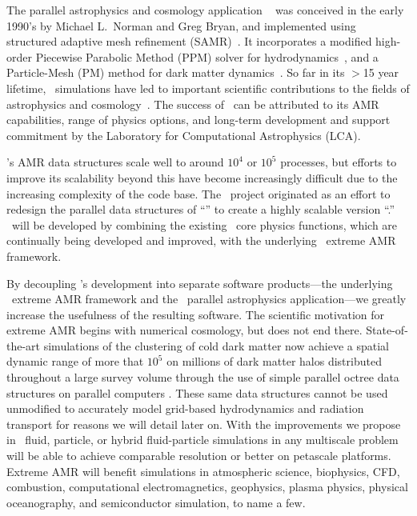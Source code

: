\documentclass[11pt,letterpaper]{article}
\begin{document}


 The parallel astrophysics and
cosmology application \enzo~\cite{OsBr04} was conceived in the early
1990's by Michael L.~Norman and Greg Bryan, and implemented using
structured adaptive mesh refinement (SAMR)~\cite{BeCo89}.  It
incorporates a modified high-order Piecewise Parabolic Method (PPM)
solver for hydrodynamics~\cite{WoCo84b}, and a Particle-Mesh (PM)
method for dark matter dynamics~\cite{HoEa88}.  So far in its $>$15
year lifetime, \enzo\ simulations have led to important scientific
contributions to the fields of astrophysics and 
cosmology~\cite{AbBr02,Hallman07,Kritsuk09,Padoan05}.
The success of \enzo\ can be attributed to
its AMR capabilities, range of physics options, and long-term
development and support commitment by the Laboratory for Computational
Astrophysics (LCA).

\enzo's AMR data structures scale well to around $10^4$ or $10^5$
processes, but efforts to improve its scalability beyond this have
become increasingly difficult due to the increasing
complexity of the code base.  The \cello\ project
originated as an effort to redesign the parallel data structures of
``\enzo'' to create a highly scalable version ``\enzoii.''  \enzoii\
will be developed by combining the existing \enzo\ core physics
functions, which are continually being developed and improved, with
the underlying \cello\ extreme AMR framework.

By decoupling \enzoii's development into separate software
products---the underlying \cello\ extreme AMR framework and the
\enzoii\ parallel astrophysics application---we greatly increase the
usefulness of the resulting software. 
The scientific
motivation for extreme AMR begins with numerical cosmology, but does not
end there. State-of-the-art simulations of the clustering of cold dark matter
now achieve a spatial dynamic range of more that $10^5$ on millions of 
dark matter halos distributed throughout a large survey volume through the use of 
simple parallel octree data structures on parallel computers \cite{Springel05}. 
These same data structures cannot be used unmodified to accurately model 
grid-based hydrodynamics and radiation transport for reasons we will detail later on.
With the improvements we propose in \cello\ fluid, particle, or hybrid
fluid-particle simulations in any multiscale problem will be able to achieve
comparable resolution or better on petascale platforms. Extreme AMR will
benefit simulations in atmospheric science, biophysics, CFD, combustion, 
computational electromagnetics, geophysics, plasma physics, physical oceanography, 
and semiconductor simulation, to name a few.
\end{document}
